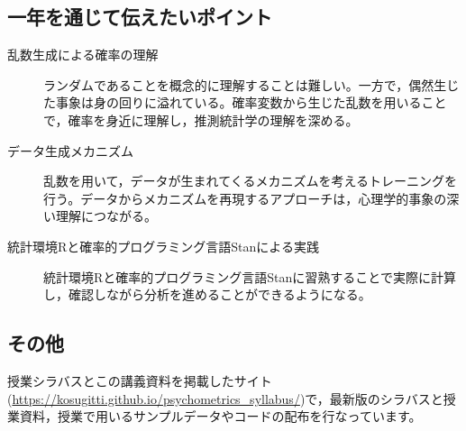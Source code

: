 \subsection*{一年を通じて伝えたいポイント}
\begin{description}
    \item[乱数生成による確率の理解] ランダムであることを概念的に理解することは難しい。一方で，偶然生じた事象は身の回りに溢れている。確率変数から生じた乱数を用いることで，確率を身近に理解し，推測統計学の理解を深める。
	\item[データ生成メカニズム] 乱数を用いて，データが生まれてくるメカニズムを考えるトレーニングを行う。データからメカニズムを再現するアプローチは，心理学的事象の深い理解につながる。
	\item[統計環境Rと確率的プログラミング言語Stanによる実践] 統計環境Rと確率的プログラミング言語Stanに習熟することで実際に計算し，確認しながら分析を進めることができるようになる。
\end{description}

\subsection*{その他}
授業シラバスとこの講義資料を掲載したサイト(\url{https://kosugitti.github.io/psychometrics_syllabus/})で，最新版のシラバスと授業資料，授業で用いるサンプルデータやコードの配布を行なっています。
